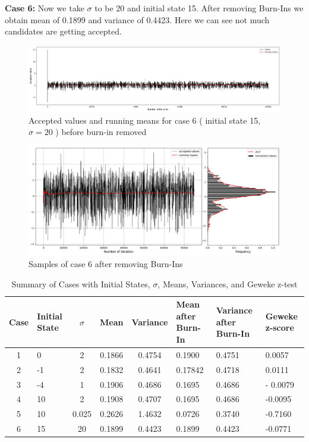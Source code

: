 \begin{example}
    \textbf{Case 6:} Now we take $ \sigma $ to be 20 and initial state 15. After removing Burn-Ins we obtain mean of 0.1899 and variance of 0.4423. Here we can see not much candidates are getting accepted.

    \begin{figure}[H]
        \centering
        \includegraphics[width=1\textwidth]{./images/metropolis/sample-6-values.png}
        \caption{Accepted values and running means for case 6 ( initial state 15, $ \sigma = 20 $ ) before burn-in removed}
    \end{figure}

    \begin{figure}[H]
        \centering
        \includegraphics[width=1\textwidth]{./images/metropolis/sample-6-value-hist-bo.png}
        \caption{Samples of case 6 after removing Burn-Ins}
    \end{figure}

    \begin{table}[ht]
        \centering
        \begin{tabular}{|c|p{2cm}|c|c|c|p{2cm}|p{2cm}|p{2cm}|}
            \hline
            Case & Initial State & $\sigma$ & Mean & Variance & Mean after Burn-In & Variance after Burn-In & Geweke z-score \\ \hline
            1 & 0 & 2 & 0.1866 & 0.4754 & 0.1900 & 0.4751 & 0.0057 \\ \hline
            2 & -1 & 2 & 0.1832 & 0.4641 & 0.17842 & 0.4718 & 0.0111 \\ \hline
            3 & -4 & 1 & 0.1906 & 0.4686 & 0.1695 & 0.4686 & - 0.0079 \\ \hline
            4 & 10 & 2 & 0.1908 & 0.4707 & 0.1695 & 0.4686 & -0.0095 \\ \hline
            5 & 10 & 0.025 & 0.2626 & 1.4632 & 0.0726 & 0.3740 & -0.7160 \\ \hline
            6 & 15 & 20 & 0.1899 & 0.4423 & 0.1899 & 0.4423 & -0.0771 \\ \hline
        \end{tabular}
        \caption{Summary of Cases with Initial States, $\sigma$, Means, Variances, and Geweke z-test}
    \end{table}


\end{example}
